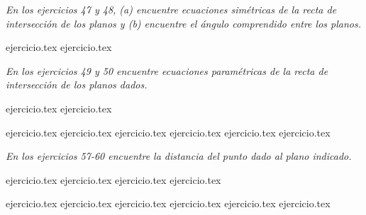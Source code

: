 \vspace{0.3cm}
\noindent\textit{En los ejercicios 47 y 48, (a) encuentre ecuaciones simétricas de la recta de intersección de los planos y (b) encuentre el ángulo comprendido entre los planos.}

\begin{enumerate}
    \setcounter{enumi}{46}
    {ejercicio.tex}
{ejercicio.tex}
\end{enumerate}

\vspace{0.3cm}
\noindent\textit{En los ejercicios 49 y 50 encuentre ecuaciones paramétricas de la recta de intersección de los planos dados.}

\begin{enumerate}
    \setcounter{enumi}{48}
    {ejercicio.tex}
{ejercicio.tex}
\end{enumerate}

\vspace{0.3cm}
\begin{enumerate}
    \setcounter{enumi}{50}
    {ejercicio.tex}
{ejercicio.tex}
{ejercicio.tex}
{ejercicio.tex}
{ejercicio.tex}
{ejercicio.tex}
\end{enumerate}

\vspace{0.3cm}
\noindent\textit{En los ejercicios 57-60 encuentre la distancia del punto dado al plano indicado.}

\begin{enumerate}
    \setcounter{enumi}{56}
    {ejercicio.tex}
{ejercicio.tex}
{ejercicio.tex}
{ejercicio.tex}
\end{enumerate}

\vspace{0.3cm}
\begin{enumerate}
    \setcounter{enumi}{60}
    {ejercicio.tex}
{ejercicio.tex}
{ejercicio.tex}
{ejercicio.tex}
{ejercicio.tex}
{ejercicio.tex}
\end{enumerate}
